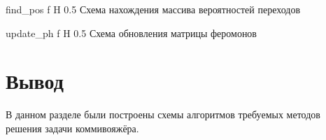 {find_pos} %
{f} %
{H} %
{0.5\textwidth} %
{Схема нахождения массива вероятностей переходов} %

{update_ph} %
{f} %
{H} %
{0.5\textwidth} %
{Схема обновления матрицы феромонов} %



\section*{Вывод}

В данном разделе были построены схемы алгоритмов требуемых методов
решения задачи коммивояжёра.

\clearpage